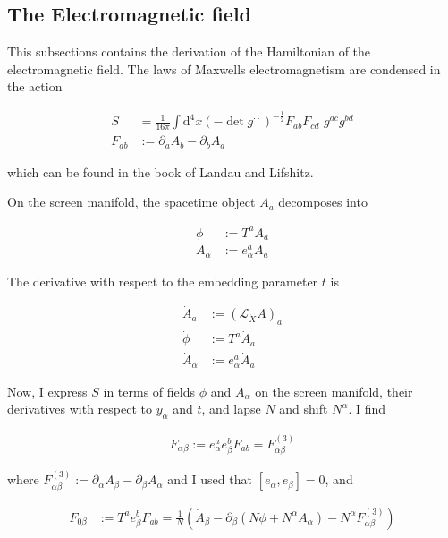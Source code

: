 \documentclass[11pt]{article}
\begin{document}
\subsection{The Electromagnetic field} \label{metric_em}

This subsections contains the derivation of the Hamiltonian of the electromagnetic field. The laws of Maxwells electromagnetism are condensed in the action

\begin{align}
	S &= \frac{1}{16 \pi} \int \mathrm{d}^4 x \left( - \det{g^{\cdot \cdot}} \right)^{-\frac{1}{2}} F_{ab} F_{cd} \, \, g^{ac} g^{bd}\\
	F_{ab} &:= \partial_a A_b - \partial_b A_a 
\end{align}

which can be found in the book of Landau and Lifshitz.

On the screen manifold, the spacetime object $A_a$ decomposes into

\begin{align}
	\phi &:= T^a A_a\\
	A_{\alpha} &:= e^a_{\alpha} A_a
\end{align}

The derivative with respect to the embedding parameter $t$ is 

\begin{align}
	\dot{A}_{a} &:= \left( \mathcal{L}_{\dot{X}} A \right)_a\\
	\dot{\phi} &:= T^a \dot{A}_{a}\\
	\dot{A}_{\alpha} &:= e^a_{\alpha} \dot{A}_{a}
\end{align}


Now, I express $S$ in terms of fields $\phi$ and $A_{\alpha}$ on the screen manifold, their derivatives with respect to $y_\alpha$ and $t$, and lapse $N$ and shift $N^{\alpha}$. I find

\begin{align}
	F_{\alpha \beta} := e^a_{\alpha} e^b_{\beta} F_{a b} = F^{(3)}_{\alpha \beta}
\end{align}

where $F^{(3)}_{\alpha \beta} := \partial_{\alpha} A_{\beta} - \partial_{\beta} A_{\alpha}  $ and I used that $\left[ e_{\alpha}, e_{\beta}\right] = 0 $, and

\begin{align}
	F_{0 \beta} &:= T^a e^b_{\beta} F_{a b} = \frac{1}{N} \left( \dot{A}_{\beta} - \partial_{\beta} \left( N \phi +  N^{\alpha} A_{\alpha} \right) - N^{\alpha}  F^{(3)}_{\alpha \beta} \right)
\end{align}
\end{document}
